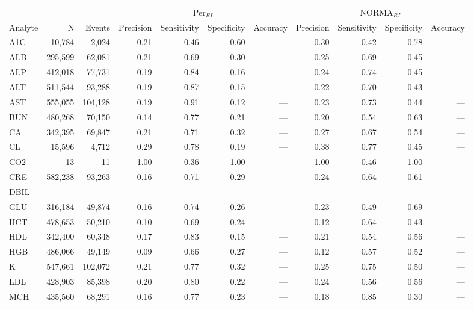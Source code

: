 \begin{table}[ht]
\centering
\footnotesize
\begin{tabular}{lrrrrrrrrrr}
\toprule
 & &  & \multicolumn{4}{c}{Per$_{RI}$} & \multicolumn{4}{c}{NORMA$_{RI}$} \\
\cmidrule(lr){4-7} \cmidrule(lr){8-11}
Analyte & N & Events & Precision & Sensitivity & Specificity & Accuracy & Precision & Sensitivity & Specificity & Accuracy \\
\midrule
A1C & 10,784 & 2,024 & 0.21 & 0.46 & 0.60 & --- & 0.30 & 0.42 & 0.78 & --- \\
ALB & 295,599 & 62,081 & 0.21 & 0.69 & 0.30 & --- & 0.25 & 0.69 & 0.45 & --- \\
ALP & 412,018 & 77,731 & 0.19 & 0.84 & 0.16 & --- & 0.24 & 0.74 & 0.45 & --- \\
ALT & 511,544 & 93,288 & 0.19 & 0.87 & 0.15 & --- & 0.22 & 0.70 & 0.43 & --- \\
AST & 555,055 & 104,128 & 0.19 & 0.91 & 0.12 & --- & 0.23 & 0.73 & 0.44 & --- \\
BUN & 480,268 & 70,150 & 0.14 & 0.77 & 0.21 & --- & 0.20 & 0.54 & 0.63 & --- \\
CA & 342,395 & 69,847 & 0.21 & 0.71 & 0.32 & --- & 0.27 & 0.67 & 0.54 & --- \\
CL & 15,596 & 4,712 & 0.29 & 0.78 & 0.19 & --- & 0.38 & 0.77 & 0.45 & --- \\
CO2 & 13 & 11 & 1.00 & 0.36 & 1.00 & --- & 1.00 & 0.46 & 1.00 & --- \\
CRE & 582,238 & 93,263 & 0.16 & 0.71 & 0.29 & --- & 0.24 & 0.64 & 0.61 & --- \\
DBIL & --- & --- & --- & --- & --- & --- & --- & --- & --- & --- \\
GLU & 316,184 & 49,874 & 0.16 & 0.74 & 0.26 & --- & 0.23 & 0.49 & 0.69 & --- \\
HCT & 478,653 & 50,210 & 0.10 & 0.69 & 0.24 & --- & 0.12 & 0.64 & 0.43 & --- \\
HDL & 342,400 & 60,348 & 0.17 & 0.83 & 0.15 & --- & 0.21 & 0.54 & 0.56 & --- \\
HGB & 486,066 & 49,149 & 0.09 & 0.66 & 0.27 & --- & 0.12 & 0.57 & 0.52 & --- \\
K & 547,661 & 102,072 & 0.21 & 0.77 & 0.32 & --- & 0.25 & 0.75 & 0.50 & --- \\
LDL & 428,903 & 85,398 & 0.20 & 0.80 & 0.22 & --- & 0.24 & 0.56 & 0.56 & --- \\
MCH & 435,560 & 68,291 & 0.16 & 0.77 & 0.23 & --- & 0.18 & 0.85 & 0.30 & --- \\

\end{tabular}
\end{table}
